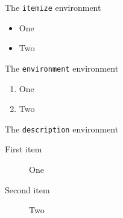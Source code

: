 \documentclass{article}
\begin{document}
\noindent
The \texttt{itemize} environment
\begin{itemize}
    \item One
    \item Two
\end{itemize}

\medskip\noindent
The \texttt{environment} environment
\begin{enumerate}
    \item One
    \item Two
\end{enumerate}

\medskip\noindent
The \texttt{description} environment
\begin{description}
    \item[First item] One
    \item[Second item] Two
\end{description}
\end{document}
